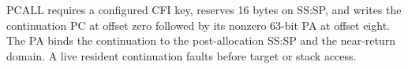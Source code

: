 PCALL requires a configured CFI key, reserves 16 bytes on SS:SP, and writes the continuation PC at offset zero followed by its nonzero 63-bit PA at offset eight. The PA binds the continuation to the post-allocation SS:SP and the near-return domain. A live resident continuation faults before target or stack access.
